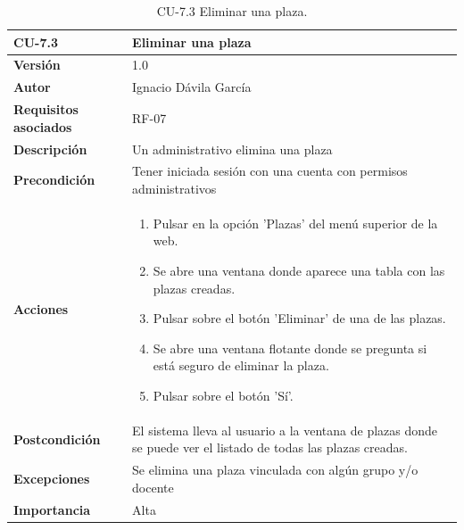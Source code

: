 \begin{table}[p]
	\centering
	\begin{tabularx}{\linewidth}{ p{} p{} }
		\toprule
		\textbf{CU-7.3}    & \textbf{Eliminar una plaza}\\
		\toprule
		\textbf{Versión}              & 1.0    \\
		\textbf{Autor}                & Ignacio Dávila García \\
		\textbf{Requisitos asociados} & RF-07 \\
		\textbf{Descripción}          & Un administrativo elimina una plaza \\
		\textbf{Precondición}         & Tener iniciada sesión con una cuenta con permisos administrativos \\
		\textbf{Acciones}             &
		\begin{enumerate}
			\def\labelenumi{\arabic{enumi}.}
			\tightlist
			\item Pulsar en la opción 'Plazas' del menú superior de la web.
			\item Se abre una ventana donde aparece una tabla con las plazas creadas.
			\item Pulsar sobre el botón 'Eliminar' de una de las plazas.
			\item Se abre una ventana flotante donde se pregunta si está seguro de eliminar la plaza.
			\item Pulsar sobre el botón 'Sí'.
		\end{enumerate}\\
		\textbf{Postcondición}        & El sistema lleva al usuario a la ventana de plazas donde se puede ver el listado de todas las plazas creadas. \\
		\textbf{Excepciones}          & Se elimina una plaza vinculada con algún grupo y/o docente \\
		\textbf{Importancia}          & Alta \\
		\bottomrule
	\end{tabularx}
	\caption{CU-7.3 Eliminar una plaza.}
\end{table}

